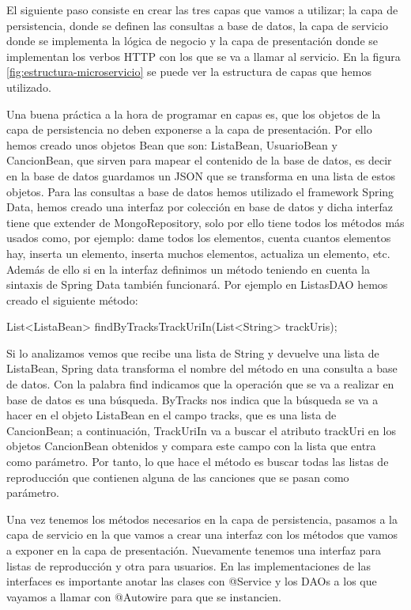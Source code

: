 \documentclass[12pt]{report} %
\begin{document}
El siguiente paso consiste en crear las tres capas que vamos a utilizar; la capa de persistencia, donde se definen las consultas a base de datos, la capa de servicio donde se implementa la lógica de negocio y la capa de presentación donde se implementan los verbos HTTP con los que se va a llamar al servicio. En la figura \ref{fig:estructura-microservicio} se puede ver la estructura de capas que hemos utilizado.

Una buena práctica a la hora de programar en capas es, que los objetos de la capa de persistencia no deben exponerse a la capa de presentación. Por ello hemos creado unos objetos Bean que son: ListaBean, UsuarioBean y CancionBean, que sirven para mapear el contenido de la base de datos, es decir en la base de datos guardamos un JSON que se transforma en una lista de estos objetos.
Para las consultas a base de datos hemos utilizado el framework Spring Data, hemos creado una interfaz por colección en base de datos y dicha interfaz tiene que extender de MongoRepository, solo por ello tiene todos los métodos más usados como, por ejemplo: dame todos los elementos, cuenta cuantos elementos hay, inserta un elemento, inserta muchos elementos, actualiza un elemento, etc. Además de ello si en la interfaz definimos un método teniendo en cuenta la sintaxis de Spring Data también funcionará. Por ejemplo en ListasDAO hemos creado el siguiente método:

List<ListaBean> findByTracksTrackUriIn(List<String> trackUris);

Si lo analizamos vemos que recibe una lista de String y devuelve una lista de ListaBean, Spring data transforma el nombre del método en una consulta a base de datos. Con la palabra find indicamos que la operación que se va a realizar en base de datos es una búsqueda. ByTracks nos indica que la búsqueda se va a hacer en el objeto ListaBean  en el campo tracks, que es una lista de CancionBean; a continuación, TrackUriIn va a buscar el atributo trackUri en los objetos CancionBean obtenidos y compara este campo con la lista que entra como parámetro. Por tanto, lo que hace el método es buscar todas las listas de reproducción que contienen alguna de las canciones que se pasan como parámetro.

Una vez tenemos los métodos necesarios en la capa de persistencia, pasamos a la capa de servicio en la que vamos a crear una interfaz con los métodos que vamos a exponer en la capa de presentación. Nuevamente tenemos una interfaz para listas de reproducción y otra para usuarios. En las implementaciones de las interfaces es importante anotar las clases con @Service y los DAOs a los que vayamos a llamar con @Autowire para que se instancien.
\end{document}
